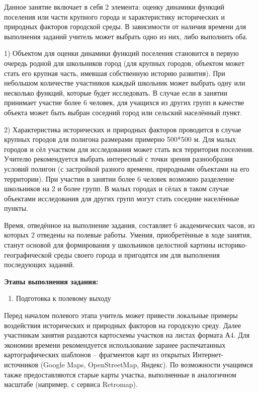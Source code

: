 \documentclass[
  11pt,
  russian,
]{book}
\providecommand{\tightlist}{%
  \setlength{\itemsep}{0pt}\setlength{\parskip}{0pt}}
\begin{document}
Данное занятие включает в себя 2 элемента: оценку динамики функций поселения или части крупного города и характеристику исторических и природных факторов городской среды. В зависимости от наличия времени для выполнения заданий учитель может выбрать одно из них, либо выполнить оба.

1) Объектом для оценки динамики функций поселения становится в первую очередь родной для школьников город (для крупных городов, объектом может стать его крупная часть, имевшая собственную историю развития). При небольшом количестве участников каждый школьник может выбрать одну или несколько функций, которые будет исследовать. В случае если в занятии принимает участие более 6 человек, для учащихся из других групп в качестве объекта может быть выбран соседний город или сельский населённый пункт.

2) Характеристика исторических и природных факторов проводится в случае крупных городов для полигона размерами примерно 500*500 м. Для малых городов и сёл участком для исследования может стать вся территория поселения. Учителю рекомендуется выбрать интересный с точки зрения разнообразия условий полигон (с застройкой разного времени, природными объектами на его территории). При участии в занятии более 6 человек возможно разделение школьников на 2 и более групп. В малых городах и сёлах в таком случае объектами исследования для других групп могут стать соседние населённые пункты.

Время, отведённое на выполнение задания, составляет 6 академических часов, из которых 2 отведены на полевые работы. Умения, приобретённые в ходе занятия, станут основой для формирования у школьников целостной картины историко-географической среды своего города и пригодятся им для выполнения последующих заданий.

\textbf{Этапы выполнения задания:}

\begin{enumerate}
\def\labelenumi{\arabic{enumi}.}
\tightlist
\item
  Подготовка к полевому выходу
\end{enumerate}

Перед началом полевого этапа учитель может привести локальные примеры воздействия исторических и природных факторов на городскую среду. Далее участникам занятия раздаются картосхемы участков на листах формата А4. Для экономии времени рекомендуется использование заранее распечатанных картографических шаблонов -- фрагментов карт из открытых Интернет-источников (Google Maps, OpenStreetMap, Яндекс). По возможности учащимся также предоставляются старые карты участка, выполненные в аналогичном масштабе (например, с сервиса Retromap).
\end{document}
